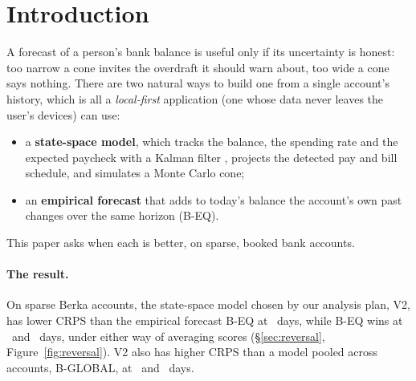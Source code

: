 \section{Introduction}
\label{sec:intro}

A forecast of a person's bank balance is useful only if its uncertainty is
honest: too narrow a cone invites the overdraft it should warn about, too
wide a cone says nothing. There are two natural ways to build one from a
single account's history, which is all a \emph{local-first} application
(one whose data never leaves the user's devices) can use:
\begin{itemize}
\item a \textbf{state-space model}, which tracks the balance, the spending
  rate and the expected paycheck with a Kalman filter \citep{kalman1960},
  projects the detected pay and bill schedule, and simulates a Monte Carlo
  cone;
\item an \textbf{empirical forecast} that adds to today's balance the
  account's own past changes over the same horizon (B-EQ).
\end{itemize}
This paper asks when each is better, on sparse, booked bank accounts.

\paragraph{The result.} On sparse Berka accounts, the state-space model
chosen by our analysis plan, V2, has lower CRPS than the empirical
forecast B-EQ at \hA\ days, while B-EQ wins at \hB\ and \hC\ days, under
either way of averaging scores (\S\ref{sec:reversal},
Figure~\ref{fig:reversal}). V2 also has higher CRPS than a model pooled
across accounts, B-GLOBAL, at \hB\ and \hC\ days.

